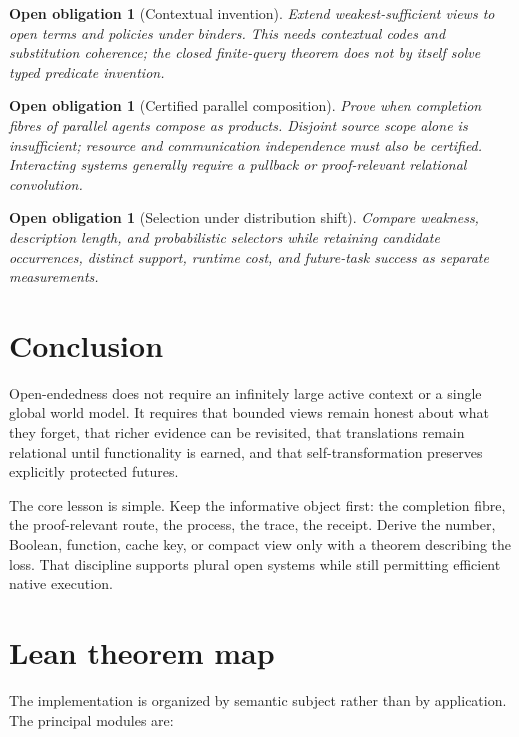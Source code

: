 \documentclass[11pt]{article}
\newtheorem{obligation}[theorem]{Open obligation}
\begin{document}
\begin{obligation}[Contextual invention]
Extend weakest-sufficient views to open terms and policies under binders.  This needs
contextual codes and substitution coherence; the closed finite-query theorem does not
by itself solve typed predicate invention.
\end{obligation}

\begin{obligation}[Certified parallel composition]
Prove when completion fibres of parallel agents compose as products.  Disjoint source
scope alone is insufficient; resource and communication independence must also be
certified.  Interacting systems generally require a pullback or proof-relevant
relational convolution.
\end{obligation}

\begin{obligation}[Selection under distribution shift]
Compare weakness, description length, and probabilistic selectors while retaining
candidate occurrences, distinct support, runtime cost, and future-task success as
separate measurements.
\end{obligation}

\section{Conclusion}

Open-endedness does not require an infinitely large active context or a single global
world model.  It requires that bounded views remain honest about what they forget,
that richer evidence can be revisited, that translations remain relational until
functionality is earned, and that self-transformation preserves explicitly protected
futures.

The core lesson is simple.  Keep the informative object first: the completion fibre,
the proof-relevant route, the process, the trace, the receipt.  Derive the number,
Boolean, function, cache key, or compact view only with a theorem describing the loss.
That discipline supports plural open systems while still permitting efficient native
execution.

\appendix
\section{Lean theorem map}

The implementation is organized by semantic subject rather than by application.
The principal modules are:
\end{document}
